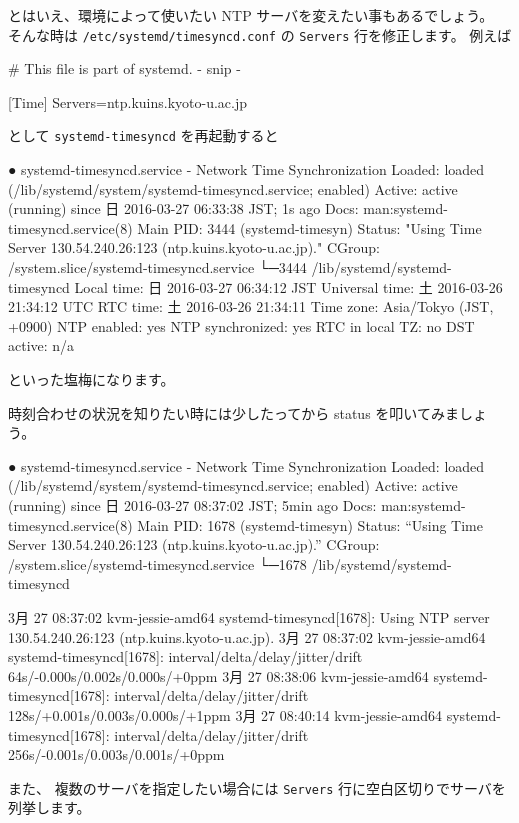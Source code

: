 \documentclass[mingoth,a4paper]{jsarticle}
\begin{document}
とはいえ、環境によって使いたい NTP サーバを変えたい事もあるでしょう。
そんな時は \verb|/etc/systemd/timesyncd.conf| の \verb|Servers| 行を修正します。
例えば
\begin{commandline}
#  This file is part of systemd.
- snip -

[Time]
Servers=ntp.kuins.kyoto-u.ac.jp
\end{commandline}
\noindent
として \verb|systemd-timesyncd| を再起動すると
\begin{commandline}
● systemd-timesyncd.service - Network Time Synchronization
   Loaded: loaded (/lib/systemd/system/systemd-timesyncd.service; enabled)
   Active: active (running) since 日 2016-03-27 06:33:38 JST; 1s ago
     Docs: man:systemd-timesyncd.service(8)
 Main PID: 3444 (systemd-timesyn)
   Status: "Using Time Server 130.54.240.26:123 (ntp.kuins.kyoto-u.ac.jp)."
   CGroup: /system.slice/systemd-timesyncd.service
           └─3444 /lib/systemd/systemd-timesyncd
      Local time: 日 2016-03-27 06:34:12 JST
  Universal time: 土 2016-03-26 21:34:12 UTC
        RTC time: 土 2016-03-26 21:34:11
       Time zone: Asia/Tokyo (JST, +0900)
     NTP enabled: yes
NTP synchronized: yes
 RTC in local TZ: no
      DST active: n/a
\end{commandline}
\noindent
といった塩梅になります。

時刻合わせの状況を知りたい時には少したってから status を叩いてみましょう。
\begin{commandline}
● systemd-timesyncd.service - Network Time Synchronization
   Loaded: loaded (/lib/systemd/system/systemd-timesyncd.service; enabled)
   Active: active (running) since 日 2016-03-27 08:37:02 JST; 5min ago
     Docs: man:systemd-timesyncd.service(8)
 Main PID: 1678 (systemd-timesyn)
   Status: ``Using Time Server 130.54.240.26:123 (ntp.kuins.kyoto-u.ac.jp).''
   CGroup: /system.slice/systemd-timesyncd.service
           └─1678 /lib/systemd/systemd-timesyncd

 3月 27 08:37:02 kvm-jessie-amd64 systemd-timesyncd[1678]: Using NTP server 130.54.240.26:123 (ntp.kuins.kyoto-u.ac.jp).
 3月 27 08:37:02 kvm-jessie-amd64 systemd-timesyncd[1678]: interval/delta/delay/jitter/drift 64s/-0.000s/0.002s/0.000s/+0ppm
 3月 27 08:38:06 kvm-jessie-amd64 systemd-timesyncd[1678]: interval/delta/delay/jitter/drift 128s/+0.001s/0.003s/0.000s/+1ppm
 3月 27 08:40:14 kvm-jessie-amd64 systemd-timesyncd[1678]: interval/delta/delay/jitter/drift 256s/-0.001s/0.003s/0.001s/+0ppm
\end{commandline}
\noindent
また、
複数のサーバを指定したい場合には \verb|Servers| 行に空白区切りでサーバを列挙します。
\end{document}
